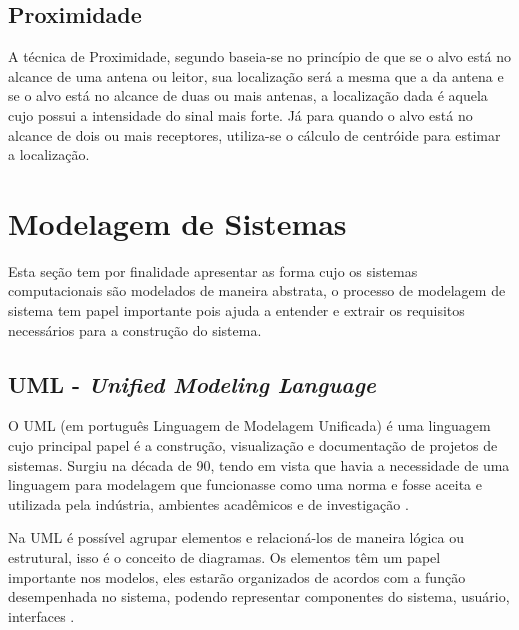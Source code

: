     \subsection{Proximidade}
    A técnica de Proximidade, segundo  baseia-se no princípio de que se o alvo está no alcance de uma antena ou leitor, sua localização será a mesma que a da antena e se o alvo está no alcance de duas ou mais antenas, a localização dada é aquela cujo possui a intensidade do sinal mais forte. Já para  quando o alvo está no alcance de dois ou mais receptores, utiliza-se o cálculo de centróide para estimar a localização.
    
\section{Modelagem de Sistemas}
    Esta seção tem por finalidade apresentar as forma cujo os sistemas computacionais são modelados de maneira abstrata, o processo de modelagem de sistema tem papel importante pois ajuda a entender e extrair os requisitos necessários para a construção do sistema.
    \subsection{UML - \textit{Unified Modeling Language}}
    O UML (em português Linguagem de Modelagem Unificada) é uma linguagem cujo principal papel é a construção, visualização e documentação de projetos de sistemas. Surgiu na década de 90, tendo em vista que havia a necessidade de uma linguagem para modelagem que funcionasse como uma norma e fosse aceita e utilizada pela indústria, ambientes acadêmicos e de investigação \cite{uml}.
    \par
    Na UML é possível agrupar elementos e relacioná-los de maneira lógica ou estrutural, isso é o conceito de diagramas. Os elementos têm um papel importante nos modelos, eles estarão organizados de acordos com a função desempenhada no sistema, podendo representar componentes do sistema, usuário, interfaces \cite{uml}.
    
